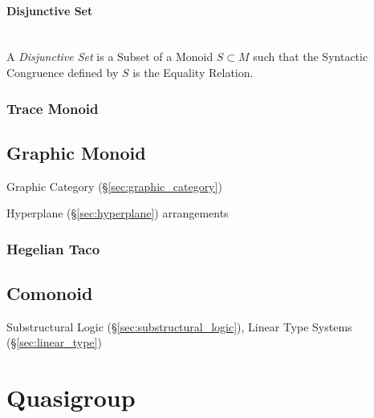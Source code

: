 \paragraph{Disjunctive Set}\label{sec:disjunctive_set}\hfill \\

A \emph{Disjunctive Set} is a Subset of a Monoid $S \subset M$ such
that the Syntactic Congruence defined by $S$ is the Equality Relation.



\subsubsection{Trace Monoid}\label{sec:trace_monoid}



\subsection{Graphic Monoid}\label{sec:graphic_monoid}


Graphic Category (\S\ref{sec:graphic_category})

Hyperplane (\S\ref{sec:hyperplane}) arrangements



\subsubsection{Hegelian Taco}\label{sec:hegelian_taco}



\subsection{Comonoid}\label{sec:comonoid}

Substructural Logic (\S\ref{sec:substructural_logic}), Linear Type
Systems (\S\ref{sec:linear_type})



\section{Quasigroup}\label{sec:quasigroup}

